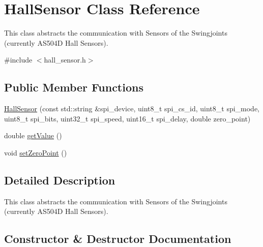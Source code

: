 \hypertarget{classHallSensor}{}\section{Hall\+Sensor Class Reference}
\label{classHallSensor}


This class abstracts the communication with Sensors of the Swingjoints (currently A\+S504D Hall Sensors).  




{\ttfamily \#include $<$hall\+\_\+sensor.\+h$>$}

\subsection*{Public Member Functions}
\begin{DoxyCompactItemize}
\item 
\hyperlink{classHallSensor_ac901b856eff0dffb4dfa5fdeaf888c4c}{Hall\+Sensor} (const std\+::string \&spi\+\_\+device, uint8\+\_\+t spi\+\_\+cs\+\_\+id, uint8\+\_\+t spi\+\_\+mode, uint8\+\_\+t spi\+\_\+bits, uint32\+\_\+t spi\+\_\+speed, uint16\+\_\+t spi\+\_\+delay, double zero\+\_\+point)
\item 
double \hyperlink{classHallSensor_a5eea1969e798bc786c5fa165aeb47c77}{get\+Value} ()
\item 
void \hyperlink{classHallSensor_ac97079734e670ba56401e6a8b37144e8}{set\+Zero\+Point} ()
\end{DoxyCompactItemize}


\subsection{Detailed Description}
This class abstracts the communication with Sensors of the Swingjoints (currently A\+S504D Hall Sensors). 

\subsection{Constructor \& Destructor Documentation}
\mbox{\label{classHallSensor_ac901b856eff0dffb4dfa5fdeaf888c4c}} 
